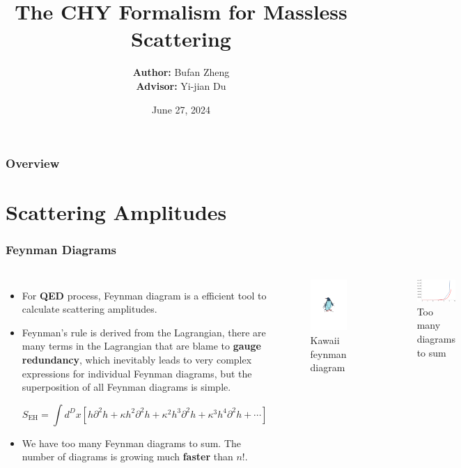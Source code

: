 \documentclass[aspectratio=169]{beamer}%
\title{The CHY Formalism for Massless Scattering}
\author[Author names]{%
		\textbf{Author: } 
		Bufan Zheng\\
		\textbf{Advisor: } 
		Yi-jian Du
}
\institute[WHU] %
{
	Wuhan University\\ %
	\medskip
	\textit{whuzbf@qq.com}\Envelope\\ %
	\medskip
	\url{https://whuzbf.github.io}
	
}
\date{June 27, 2024} %
\begin{document}
	\begin{frame}
		\titlepage %
	\end{frame}
	
	\begin{frame}
		\frametitle{Overview} %
		\tableofcontents 
	\end{frame}
	\section{Scattering Amplitudes}
	\begin{frame}
		\frametitle{Feynman Diagrams}
		\begin{columns}
			\column{0.7\textwidth}
			\begin{itemize}
				\setlength{\itemsep}{.3cm}
				\item <1-> {
					For \textbf{QED} process, Feynman diagram is a efficient tool to calculate scattering amplitudes.
				}
				\item <2-> {
					Feynman's rule is derived from the Lagrangian, there are many terms in the Lagrangian that are blame to \textbf{gauge redundancy}, which inevitably leads to very complex expressions for individual Feynman diagrams, but the superposition of all Feynman diagrams is simple.
					
					$$
					S_{\text{EH}}=\int d^{D}x\left[h\partial^{2}h+\kappa h^{2}\partial^{2}h+\kappa^{2}h^{3}\partial^{2}h+\kappa^{3}h^{4}\partial^{2}h+\cdots\right]
					$$
				}
				\item <3-> {
					We have too many Feynman diagrams to sum. The number of diagrams is growing much \textbf{faster} than $n!$.
				}
			\end{itemize}
			\column{0.3\textwidth}
			 { %
			\begin{figure}
				\centering
				\includegraphics[width=4cm]{figs/penguin.pdf}
				\caption{Kawaii feynman diagram}
			\end{figure}}
			\only <3> {
				\begin{figure}
					\centering
					\includegraphics[width=4cm]{figs/2.pdf}
					\caption{Too many diagrams to sum}
			\end{figure}}
		\end{columns}
	\end{frame}
\end{document}
